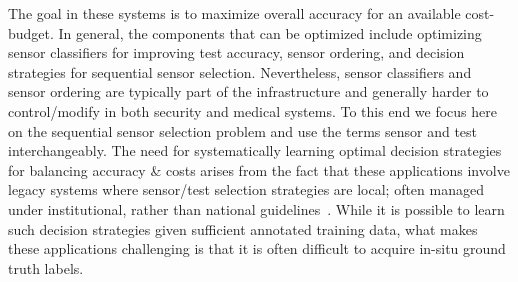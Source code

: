 %
The goal in these systems is to maximize overall accuracy for an available cost-budget. In general, the components that can be optimized include optimizing sensor classifiers for improving test accuracy, sensor ordering, and decision strategies for sequential sensor selection. Nevertheless, sensor classifiers and sensor ordering are typically part of the infrastructure and generally harder to control/modify in both security and medical systems. To this end we focus here  on the sequential sensor selection problem and use the terms sensor and test interchangeably. The need for systematically learning optimal decision strategies for balancing accuracy \& costs arises from the fact that these applications involve legacy systems where sensor/test selection strategies are local; often managed under institutional, rather than national guidelines~\cite{baghdadian}. %
While it is possible to learn such decision strategies given sufficient annotated training data, what makes these applications challenging is that it is often difficult to acquire in-situ ground truth labels. 

